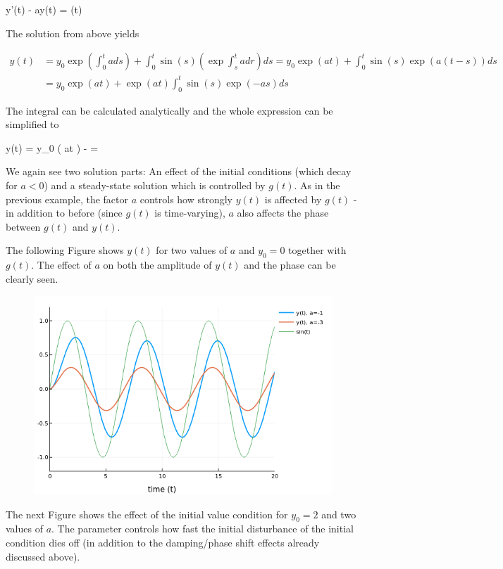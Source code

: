 \bee
y'(t) - ay(t) = \sin(t)
\eee

The solution from above yields

\begin{align*}
y(t) &= y_0 \exp \left( \int_0^t a ds \right) + \int_0^t \sin(s) \left( \exp \int_s^t a dr \right) ds = y_0 \exp \left( at \right) + \int_0^t \sin(s) \exp \left( a(t-s) \right) ds \\
&= y_0 \exp \left( at \right) + \exp(at) \int_0^t \sin(s) \exp (-as) ds
\end{align*}

The integral can be calculated analytically and the whole expression can be simplified to

\bee
y(t) = y_0 \exp \left( at \right) -  =  
\eee

We again see two solution parts: An effect of the initial conditions (which decay for $a < 0$) and a steady-state solution which is controlled by $g(t)$. As in the previous example, the factor $a$ controls how strongly $y(t)$ is affected by $g(t)$ - in addition to before (since $g(t)$ is time-varying), $a$ also affects the phase between $g(t)$ and $y(t)$.


The following Figure shows $y(t)$ for two values of $a$ and $y_0=0$ together with $g(t)$. The effect of $a$ on both the amplitude of $y(t)$ and the phase can be clearly seen.

\begin{figure}[H]
	\includegraphics[scale=0.5]{images/ode_02_03.png}
\end{figure}

The next Figure shows the effect of the initial value condition for $y_0 = 2$ and two values of $a$. The parameter controls how fast the initial disturbance of the initial condition  dies off (in addition to the damping/phase shift effects already discussed above).

